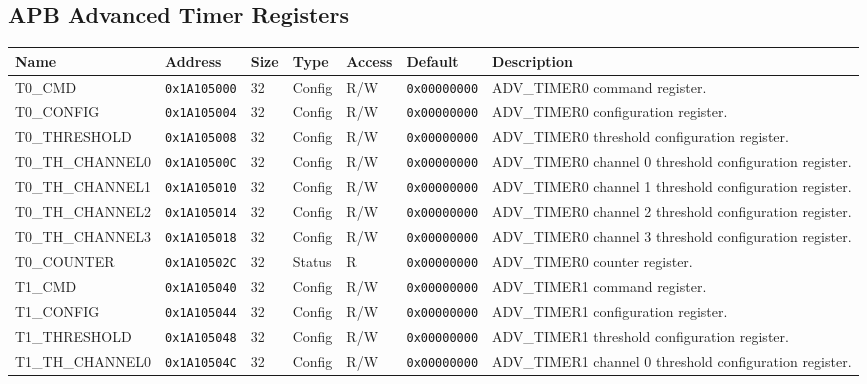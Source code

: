 
\subsection{APB Advanced Timer Registers}
{\small
\begin{tabularx}{\textwidth}{|l|l|l|l|l|l|X|}
  \hline
  \textbf{Name} & \textbf{Address}  & \textbf{Size} & \textbf{Type} & \textbf{Access} & \textbf{Default} & \textbf{Description} \\
  \hline
  T0\_CMD & \texttt{0x1A105000} & 32 & Config & R/W & \texttt{0x00000000} & ADV\_TIMER0 command register.\\
  \hline
  T0\_CONFIG & \texttt{0x1A105004} & 32 & Config & R/W & \texttt{0x00000000} & ADV\_TIMER0 configuration register.\\
  \hline
  T0\_THRESHOLD & \texttt{0x1A105008} & 32 & Config & R/W & \texttt{0x00000000} & ADV\_TIMER0 threshold configuration register.\\
  \hline
  T0\_TH\_CHANNEL0 & \texttt{0x1A10500C} & 32 & Config & R/W & \texttt{0x00000000} & ADV\_TIMER0 channel 0 threshold configuration register.\\
  \hline
  T0\_TH\_CHANNEL1 & \texttt{0x1A105010} & 32 & Config & R/W & \texttt{0x00000000} & ADV\_TIMER0 channel 1 threshold configuration register.\\
  \hline
  T0\_TH\_CHANNEL2 & \texttt{0x1A105014} & 32 & Config & R/W & \texttt{0x00000000} & ADV\_TIMER0 channel 2 threshold configuration register.\\
  \hline
  T0\_TH\_CHANNEL3 & \texttt{0x1A105018} & 32 & Config & R/W & \texttt{0x00000000} & ADV\_TIMER0 channel 3 threshold configuration register.\\
  \hline
  T0\_COUNTER & \texttt{0x1A10502C} & 32 & Status & R & \texttt{0x00000000} & ADV\_TIMER0 counter register.\\
  \hline
  T1\_CMD & \texttt{0x1A105040} & 32 & Config & R/W & \texttt{0x00000000} & ADV\_TIMER1 command register.\\
  \hline
  T1\_CONFIG & \texttt{0x1A105044} & 32 & Config & R/W & \texttt{0x00000000} & ADV\_TIMER1 configuration register.\\
  \hline
  T1\_THRESHOLD & \texttt{0x1A105048} & 32 & Config & R/W & \texttt{0x00000000} & ADV\_TIMER1 threshold configuration register.\\
  \hline
  T1\_TH\_CHANNEL0 & \texttt{0x1A10504C} & 32 & Config & R/W & \texttt{0x00000000} & ADV\_TIMER1 channel 0 threshold configuration register.\\

\end{tabularx}}

